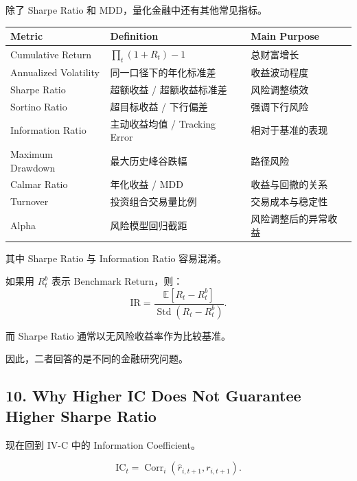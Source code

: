 除了 Sharpe Ratio 和 MDD，量化金融中还有其他常见指标。

\begin{readertable}
\begin{longtable}[]{@{}
  >{\raggedright\arraybackslash}p{}
  >{\raggedright\arraybackslash}p{}
  >{\raggedright\arraybackslash}p{}@{}}
\toprule
Metric & Definition & Main Purpose \\
\midrule
\endhead
Cumulative Return & \(\prod_t(1+R_t)-1\) & 总财富增长 \\
Annualized Volatility & 同一口径下的年化标准差 & 收益波动程度 \\
Sharpe Ratio & 超额收益 / 超额收益标准差 & 风险调整绩效 \\
Sortino Ratio & 超目标收益 / 下行偏差 & 强调下行风险 \\
Information Ratio & 主动收益均值 / Tracking Error & 相对于基准的表现 \\
Maximum Drawdown & 最大历史峰谷跌幅 & 路径风险 \\
Calmar Ratio & 年化收益 / MDD & 收益与回撤的关系 \\
Turnover & 投资组合交易量比例 & 交易成本与稳定性 \\
Alpha & 风险模型回归截距 & 风险调整后的异常收益 \\
\bottomrule
\end{longtable}
\end{readertable}

其中 Sharpe Ratio 与 Information Ratio 容易混淆。

如果用 \(R_t^b\) 表示 Benchmark Return，则：
\[\mathrm{IR}
=
\frac{
\mathbb E[R_t-R_t^b]
}{
\operatorname{Std}(R_t-R_t^b)
}.\]

而 Sharpe Ratio 通常以无风险收益率作为比较基准。

因此，二者回答的是不同的金融研究问题。

\hypertarget{part-4-67-0001-why-higher-ic-does-not-guarantee-higher-sharpe-ratio}{%
\subsection{10. Why Higher IC Does Not Guarantee Higher Sharpe Ratio}\label{part-4-67-0001-why-higher-ic-does-not-guarantee-higher-sharpe-ratio}}

现在回到 IV-C 中的 Information Coefficient。

\[\mathrm{IC}_t
=
\operatorname{Corr}_i
(\hat r_{i,t+1},r_{i,t+1}).\]

